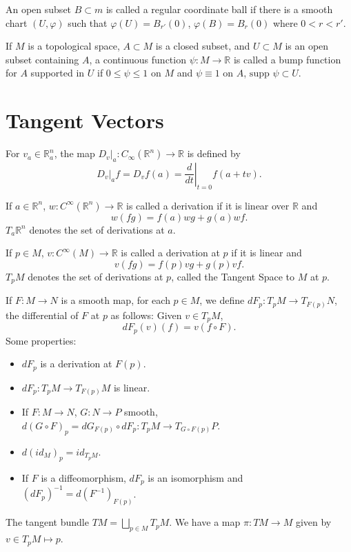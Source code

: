 \documentclass[12pt]{scrartcl}
\newcommand{\R}{\mathbb{R}}
\newcommand\at[2]{\left.#1\right|_{#2}}
\let \phi \varphi
\newcommand{\supp}{\text{supp }}
\begin{document}
\begin{definition} An open subset $B \subset m$ is called a regular coordinate ball if there is a smooth chart $(U, \phi)$ such that $\phi(U) = B_{r'}(0)$, $\phi(B) = B_r(0)$ where $0 < r < r'$.
\end{definition}

\begin{definition} If $M$ is a topological space, $A \subset M$ is a closed subset, and $U \subset M$ is an open subset containing $A$, a continuous function $\psi: M \to \R$ is called a bump function for $A$ supported in $U$ if $0 \le \psi \le 1$ on $M$ and $\psi \equiv 1$ on $A$, $\supp \psi \subset U$.
\end{definition}

\section{Tangent Vectors}
\begin{definition} For $v_a \in \R_a^n$, the map $D_v\vert_a: C_\infty(\R^n) \to \R$ is defined by
$$D_v\vert_a f = D_vf(a) = \at{\frac{d}{dt}}{t=0}f(a + tv).$$
\end{definition}
\begin{definition} If $a \in \R^n$, $w: C^\infty(\R^n) \to \R$ is called a derivation if it is linear over $\R$ and 
$$w(fg) = f(a)wg + g(a)wf.$$
$T_a\R^n$ denotes the set of derivations at $a$.
\end{definition}
\begin{definition} If $p \in M$, $v: C^\infty(M) \to \R$ is called a derivation at $p$ if it is linear and
$$v(fg) = f(p)vg + g(p)vf.$$
$T_pM$ denotes the set of derivations at $p$, called the Tangent Space to $M$ at $p$.
\end{definition}
\begin{definition} If $F:M \to N$ is a smooth map, for each $p \in M$, we define 
$dF_p: T_pM \to T_{F(p)}N$, the differential of $F$ at $p$ as follows:  Given $v \in T_pM$, $$dF_p(v)(f) = v(f \circ F).$$
Some properties:
\begin{itemize}
\item $dF_p$ is a derivation at $F(p)$.
\item $dF_p: T_pM \to T_{F(p)}M$ is linear.
\item If $F:M\to N$, $G: N \to P$ smooth, $d(G \circ F)_p = dG_{F(p)}\circ dF_p:T_pM \to T_{G \circ F(p)}P$.
\item $d(id_M)_p = id_{T_pM}$.
\item If $F$ is a diffeomorphism, $dF_p$ is an isomorphism and $(dF_p)^{-1} = d(F^{-1})_{F(p)}$.
\end{itemize}


\end{definition}
\begin{definition} The tangent bundle $TM = \bigsqcup_{p\in M} T_pM$.  We have a map $\pi: TM \to M$ given by $v \in T_pM \mapsto p$.
\end{definition}
\end{document}
